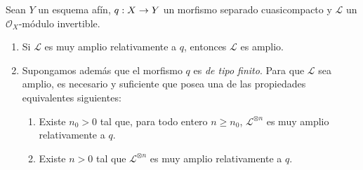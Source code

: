 \documentclass[oneside,10pt]{amsart}
\makeatletter
\renewcommand{\geq}{\geqslant}
\newcommand{\ega@arrow}[2]{\mathchoice{#1}{#2}{#2}{#2}}
\renewcommand{\to}{\ega@arrow{\longrightarrow}{\rightarrow}}
\let\EGAOriginalLabel\label
\renewcommand{\label}[1]{\phantomsection\EGAOriginalLabel{#1}}
\makeatother
\begin{document}
\begin{proposition}[4.5.10]
\label{II.4.5.10-fr}
Sean $Y$ un esquema afín, $q:X\to Y$ un morfismo separado cuasicompacto y $\mathcal{L}$ un $\mathcal{O}_X$-módulo invertible.
\begin{enumerate}
  \item[\rm{(i)}] Si $\mathcal{L}$ es muy amplio relativamente a $q$, entonces $\mathcal{L}$ es amplio.
  \item[\rm{(ii)}] Supongamos además que el morfismo $q$ es \emph{de tipo finito}.
    Para que $\mathcal{L}$ sea amplio, es necesario y suficiente que posea una de las propiedades equivalentes siguientes:
    \begin{enumerate}
      \item[\rm{(e)}] Existe $n_0>0$ tal que, para todo entero $n\geq n_0$, $\mathcal{L}^{\otimes n}$ es muy amplio relativamente a $q$.
      \item[\rm{(e')}] Existe $n>0$ tal que $\mathcal{L}^{\otimes n}$ es muy amplio relativamente a $q$.
    \end{enumerate}
\end{enumerate}
\end{proposition}
\end{document}
